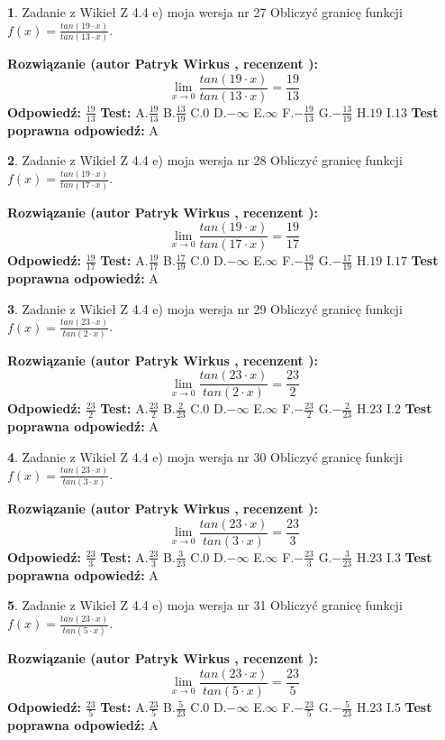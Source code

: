 \documentclass[12pt, a4paper]{article}
\theoremstyle{definition} %
\newtheorem{zad}{}
\newcommand{\zadStart}[1]{\begin{zad}#1\newline}
\newcommand{\zadStop}{\end{zad}}
\newcommand{\rozwStart}[2]{\noindent \textbf{Rozwiązanie (autor #1 , recenzent #2): }\newline}
\newcommand{\rozwStop}{\newline}
\newcommand{\odpStart}{\noindent \textbf{Odpowiedź:}\newline}
\newcommand{\odpStop}{\newline}
\newcommand{\testStart}{\noindent \textbf{Test:}\newline}
\newcommand{\testStop}{\newline}
\newcommand{\kluczStart}{\noindent \textbf{Test poprawna odpowiedź:}\newline}
\newcommand{\kluczStop}{\newline}
\begin{document}
\zadStart{Zadanie z Wikieł Z 4.4 e) moja wersja nr 27}
Obliczyć granicę funkcji $f(x)=\frac{tan(19\cdot x)}{tan(13\cdot x)}$.
\zadStop
\rozwStart{Patryk Wirkus}{}
$$\lim\limits_{x\to 0}\frac{tan(19\cdot x)}{tan(13\cdot x)}=
\frac{19}{13}$$
\rozwStop
\odpStart
$\frac{19}{13}$
\odpStop
\testStart
A.$\frac{19}{13}$
B.$\frac{13}{19}$
C.$0$
D.$-\infty$
E.$\infty$
F.$-\frac{19}{13}$
G.$-\frac{13}{19}$
H.$19$
I.$13$
\testStop
\kluczStart
A
\kluczStop



\zadStart{Zadanie z Wikieł Z 4.4 e) moja wersja nr 28}
Obliczyć granicę funkcji $f(x)=\frac{tan(19\cdot x)}{tan(17\cdot x)}$.
\zadStop
\rozwStart{Patryk Wirkus}{}
$$\lim\limits_{x\to 0}\frac{tan(19\cdot x)}{tan(17\cdot x)}=
\frac{19}{17}$$
\rozwStop
\odpStart
$\frac{19}{17}$
\odpStop
\testStart
A.$\frac{19}{17}$
B.$\frac{17}{19}$
C.$0$
D.$-\infty$
E.$\infty$
F.$-\frac{19}{17}$
G.$-\frac{17}{19}$
H.$19$
I.$17$
\testStop
\kluczStart
A
\kluczStop



\zadStart{Zadanie z Wikieł Z 4.4 e) moja wersja nr 29}
Obliczyć granicę funkcji $f(x)=\frac{tan(23\cdot x)}{tan(2\cdot x)}$.
\zadStop
\rozwStart{Patryk Wirkus}{}
$$\lim\limits_{x\to 0}\frac{tan(23\cdot x)}{tan(2\cdot x)}=
\frac{23}{2}$$
\rozwStop
\odpStart
$\frac{23}{2}$
\odpStop
\testStart
A.$\frac{23}{2}$
B.$\frac{2}{23}$
C.$0$
D.$-\infty$
E.$\infty$
F.$-\frac{23}{2}$
G.$-\frac{2}{23}$
H.$23$
I.$2$
\testStop
\kluczStart
A
\kluczStop



\zadStart{Zadanie z Wikieł Z 4.4 e) moja wersja nr 30}
Obliczyć granicę funkcji $f(x)=\frac{tan(23\cdot x)}{tan(3\cdot x)}$.
\zadStop
\rozwStart{Patryk Wirkus}{}
$$\lim\limits_{x\to 0}\frac{tan(23\cdot x)}{tan(3\cdot x)}=
\frac{23}{3}$$
\rozwStop
\odpStart
$\frac{23}{3}$
\odpStop
\testStart
A.$\frac{23}{3}$
B.$\frac{3}{23}$
C.$0$
D.$-\infty$
E.$\infty$
F.$-\frac{23}{3}$
G.$-\frac{3}{23}$
H.$23$
I.$3$
\testStop
\kluczStart
A
\kluczStop



\zadStart{Zadanie z Wikieł Z 4.4 e) moja wersja nr 31}
Obliczyć granicę funkcji $f(x)=\frac{tan(23\cdot x)}{tan(5\cdot x)}$.
\zadStop
\rozwStart{Patryk Wirkus}{}
$$\lim\limits_{x\to 0}\frac{tan(23\cdot x)}{tan(5\cdot x)}=
\frac{23}{5}$$
\rozwStop
\odpStart
$\frac{23}{5}$
\odpStop
\testStart
A.$\frac{23}{5}$
B.$\frac{5}{23}$
C.$0$
D.$-\infty$
E.$\infty$
F.$-\frac{23}{5}$
G.$-\frac{5}{23}$
H.$23$
I.$5$
\testStop
\kluczStart
A
\kluczStop
\end{document}
